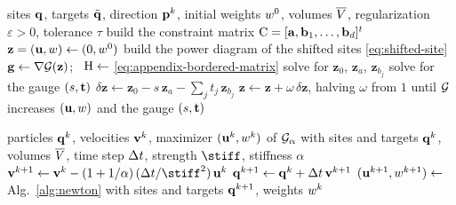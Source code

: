 \documentclass[main.tex]{subfiles}
\begin{document}
\begin{algorithm}[h]
  \caption{Bordered Newton solve of \eqref{eq:flow-line-constraint} (Appendix~\ref{sec:appendix-bordered}).}
  \label{alg:flow-constrained-newton}
  \begin{algorithmic}[1]
    \Require sites $\mathbf{q}$, targets $\tilde{\mathbf{q}}$, direction $\mathbf{p}^k$, initial weights $w^0$, volumes $\overline{V}$, regularization $\varepsilon \!>\! 0$, tolerance $\tau$
    \State build the constraint matrix $\mathrm{C} = [\mathbf{a}, \mathbf{b}_1, \dots, \mathbf{b}_d]^{t}$ \Comment{\eqref{eq:appendix-constraint-matrix}}
    \State $\mathbf{z} = (\mathbf{u}, w) \gets (0, w^0)$
    \Repeat
      \State build the power diagram of the shifted sites \eqref{eq:shifted-site}
      \State $\mathbf{g} \gets \nabla\mathcal{G}(\mathbf{z})$; \ $\mathrm{H} \gets$ \eqref{eq:appendix-bordered-matrix}
      \State solve for $\mathbf{z}_0$, $\mathbf{z}_a$, $\mathbf{z}_{b_j}$ 
      \State solve for the gauge $(s, \mathbf{t})$ 
      \State $\delta\mathbf{z} \gets \mathbf{z}_0 - s\,\mathbf{z}_a - \sum_j t_j\,\mathbf{z}_{b_j}$ \Comment{\eqref{eq:flow-constrained-elimination-update}}
      \State $\mathbf{z} \gets \mathbf{z} + \omega\,\delta\mathbf{z}$, halving $\omega$ from $1$ until $\mathcal{G}$ increases
     
    \State \Return $(\mathbf{u}, w)$ and the gauge $(s, \mathbf{t})$
  \end{algorithmic}
\end{algorithm}

\begin{algorithm}[h]
  \caption{Time step of the penalty-based integrator (\S\ref{sec:flow-penalty}).}
  \label{alg:flow-penalty}
  \begin{algorithmic}[1]
    \Require particles $\mathbf{q}^k$, velocities $\mathbf{v}^k$, maximizer $(\mathbf{u}^k, w^k)$ of $\mathcal{G}_\alpha$ with sites and targets $\mathbf{q}^k$, volumes $\overline{V}$, time step $\Delta t$, strength $\stiff$, stiffness $\alpha$
    \State $\vel^{k+1} \gets \vel^k - (1 + 1/\alpha)\,(\tstep/\stiff^2)\,\shift^k$ 
    \State $\mathbf{q}^{k+1} \gets \mathbf{q}^k + \Delta t\,\mathbf{v}^{k+1}$ 
    \State $(\mathbf{u}^{k+1}, w^{k+1}) \gets$ Alg.~\ref{alg:newton} with sites and targets $\mathbf{q}^{k+1}$, weights $w^k$
  \end{algorithmic}
\end{algorithm}
\end{document}
